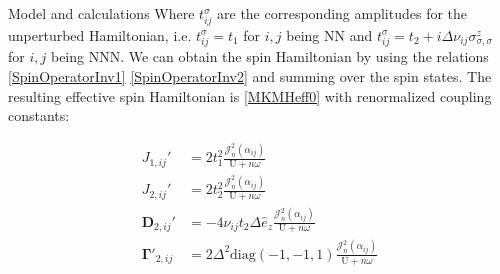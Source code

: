 \documentclass[aps,prl,twocolumn,amsmath,amssymb,superscriptaddress,nobibnotes]{revtex4}%
\newcommand{\bs}{\boldsymbol}
\begin{document}
\begin{section}{Model and calculations}
Where $t_{ij}^{\sigma}$ are the corresponding amplitudes for the unperturbed Hamiltonian, i.e. $t_{ij}^{\sigma} = t_1$ for $i,j$ being NN and $t_{ij}^{\sigma} = t_2 + i\Delta\nu_{ij}\sigma^z_{\sigma, \sigma}$ for $i,j$ being NNN. We can obtain the spin Hamiltonian by using the relations \ref{SpinOperatorInv1} \ref{SpinOperatorInv2} and summing over the spin states. The resulting effective spin Hamiltonian is \ref{MKMHeff0} with renormalized coupling constants:

\begin{align*}
J_{1,ij}' &= 2t_1^2\frac{\mathcal{J}_{n}^2(\alpha_{ij})}{\text{U}+n\omega} \\
J_{2,ij}' &= 2t_2^2\frac{\mathcal{J}_{n}^2(\alpha_{ij})}{\text{U}+n\omega} \\
\bs{D}_{2,ij}' &= - 4\nu_{ij} t_2 \Delta \hat{e}_z \frac{\mathcal{J}_{n}^2(\alpha_{ij})}{\text{U}+n\omega} \\
\bs{\Gamma}'_{2,ij} &= 2\Delta^2 \text{diag}(-1,-1,1) \frac{\mathcal{J}_{n}^2(\alpha_{ij})}{\text{U}+n\omega}
\end{align*}


\end{section}
\end{document}
